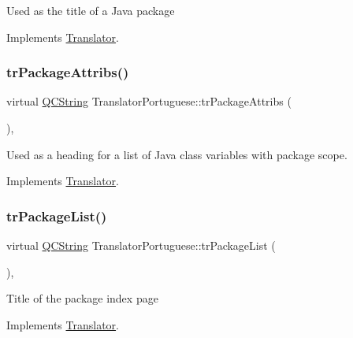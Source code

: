 Used as the title of a Java package 

Implements \mbox{\hyperlink{class_translator}{Translator}}.

\mbox{\label{class_translator_portuguese_a9844834ead1d1a1aff83c3f6eda97c42}} 
\subsubsection{\texorpdfstring{trPackageAttribs()}{trPackageAttribs()}}
{\footnotesize\ttfamily virtual \mbox{\hyperlink{class_q_c_string}{Q\+C\+String}} Translator\+Portuguese\+::tr\+Package\+Attribs (\begin{DoxyParamCaption}{ }\end{DoxyParamCaption})\hspace{0.3cm}{\ttfamily [inline]}, {\ttfamily [virtual]}}

Used as a heading for a list of Java class variables with package scope. 

Implements \mbox{\hyperlink{class_translator}{Translator}}.

\mbox{\label{class_translator_portuguese_aea85249790d42ac65ec1771a773ba46a}} 
\subsubsection{\texorpdfstring{trPackageList()}{trPackageList()}}
{\footnotesize\ttfamily virtual \mbox{\hyperlink{class_q_c_string}{Q\+C\+String}} Translator\+Portuguese\+::tr\+Package\+List (\begin{DoxyParamCaption}{ }\end{DoxyParamCaption})\hspace{0.3cm}{\ttfamily [inline]}, {\ttfamily [virtual]}}

Title of the package index page 

Implements \mbox{\hyperlink{class_translator}{Translator}}.

\mbox{\label{class_translator_portuguese_a648632f8fd2eed89ebfb700c4d404f8a}} 
